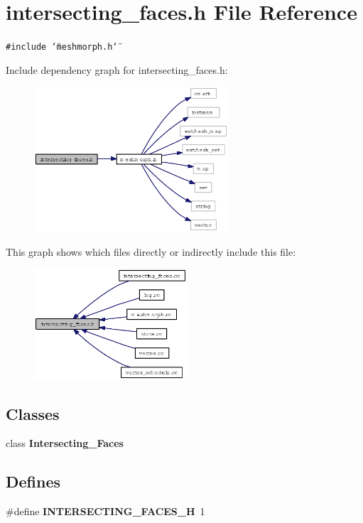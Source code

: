 \section{intersecting\_\-faces.h File Reference}
\label{intersecting__faces_8h}
{\tt \#include \char`\"{}meshmorph.h\char`\"{}}\par


Include dependency graph for intersecting\_\-faces.h:\begin{figure}[H]
\begin{center}
\leavevmode
\includegraphics[width=205pt]{intersecting__faces_8h__incl}
\end{center}
\end{figure}


This graph shows which files directly or indirectly include this file:\begin{figure}[H]
\begin{center}
\leavevmode
\includegraphics[width=161pt]{intersecting__faces_8h__dep__incl}
\end{center}
\end{figure}
\subsection*{Classes}
\begin{CompactItemize}
\item 
class {\bf Intersecting\_\-Faces}
\end{CompactItemize}
\subsection*{Defines}
\begin{CompactItemize}
\item 
\#define {\bf INTERSECTING\_\-FACES\_\-H}~1
\end{CompactItemize}
